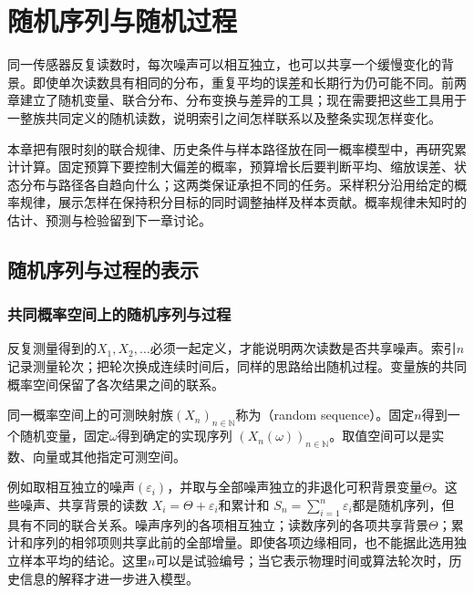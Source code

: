 \chapter{随机序列与随机过程}
\label{chap:random-sequences-and-processes}
\label{chap:stochastic-processes-and-approximation}

同一传感器反复读数时，每次噪声可以相互独立，也可以共享一个缓慢变化的背景。即使单次读数具有相同的分布，重复平均的误差和长期行为仍可能不同。前两章建立了随机变量、联合分布、分布变换与差异的工具；现在需要把这些工具用于一整族共同定义的随机读数，说明索引之间怎样联系以及整条实现怎样变化。

本章把有限时刻的联合规律、历史条件与样本路径放在同一概率模型中，再研究累计计算。固定预算下要控制大偏差的概率，预算增长后要判断平均、缩放误差、状态分布与路径各自趋向什么；这两类保证承担不同的任务。采样积分沿用给定的概率规律，展示怎样在保持积分目标的同时调整抽样及样本贡献。概率规律未知时的估计、预测与检验留到下一章讨论。

\section{随机序列与过程的表示}
\label{sec:rv-sequences-processes}
\label{sec:stoch-process-joint-laws}
\label{sec:rv-sequences}

\subsection{共同概率空间上的随机序列与过程}
\label{sec:stoch-common-space-sequences}

反复测量得到的\(X_1,X_2,\ldots\)必须一起定义，才能说明两次读数是否共享噪声。索引\(n\)记录测量轮次；把轮次换成连续时间后，同样的思路给出随机过程。变量族的共同概率空间保留了各次结果之间的联系。
\begin{definition}[随机序列]
\label{def:rv-random-sequence}
同一概率空间上的可测映射族\((X_n)_{n\in\mathbb N}\)称为（random sequence）。固定\(n\)得到一个随机变量，固定\(\omega\)得到确定的实现序列
\((X_n(\omega))_{n\in\mathbb N}\)。取值空间可以是实数、向量或其他指定可测空间。
\end{definition}
例如取相互独立的噪声\((\varepsilon_i)\)，并取与全部噪声独立的非退化可积背景变量\(\Theta\)。这些噪声、共享背景的读数
\(X_i=\Theta+\varepsilon_i\)和累计和
\(S_n=\sum_{i=1}^n\varepsilon_i\)都是随机序列，但具有不同的联合关系。噪声序列的各项相互独立；读数序列的各项共享背景\(\Theta\)；累计和序列的相邻项则共享此前的全部增量。即使各项边缘相同，也不能据此选用独立样本平均的结论。这里\(n\)可以是试验编号；当它表示物理时间或算法轮次时，历史信息的解释才进一步进入模型。

